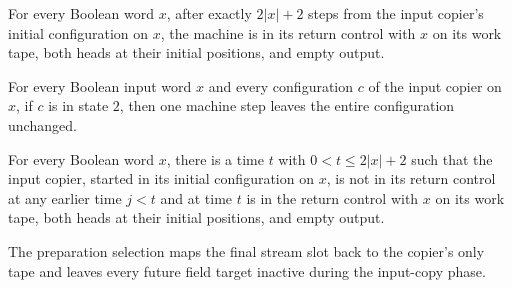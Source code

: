 \begin{lemma}
\label{Complexity.clInput_run}
\leanok
{}
For every Boolean word $x$, after exactly $2|x|+2$ steps from the input copier’s initial
configuration on $x$, the machine is in its return control with $x$ on its work tape,
both heads at their initial positions, and empty output.
\end{lemma}

\begin{lemma}
\label{Complexity.clInput_idle}
\leanok
{}
For every Boolean input word $x$ and every configuration $c$ of the input copier on $x$,
if $c$ is in state $2$, then one machine step leaves the entire configuration unchanged.
\end{lemma}

\begin{lemma}
\label{Complexity.clInput_first}
\leanok
{}
For every Boolean word $x$, there is a time $t$ with $0<t\le 2|x|+2$ such that the input
copier, started in its initial configuration on $x$, is not in its return control at any
earlier time $j<t$ and at time $t$ is in the return control with $x$ on its work tape,
both heads at their initial positions, and empty output.
\end{lemma}

\begin{definition}
\label{Complexity.clPrepareSelect}
\leanok
{}
The preparation selection maps the final stream slot back to the copier's only tape and leaves every future field target inactive during the input-copy phase.
\end{definition}

